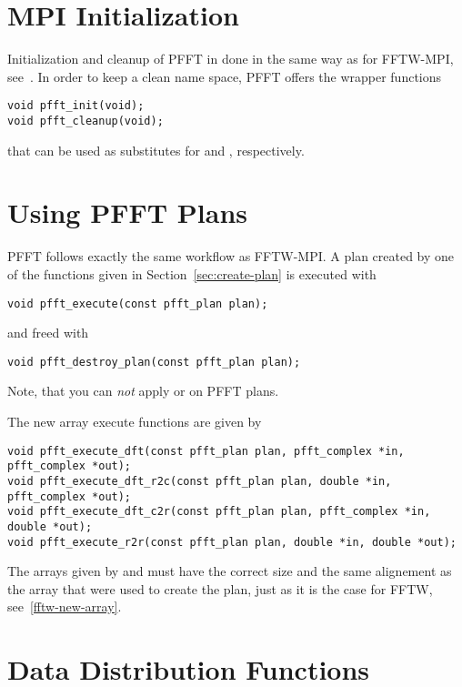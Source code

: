 \section{MPI Initialization}
Initialization and cleanup of PFFT in done in the same way as for FFTW-MPI, see~\cite{fftw-mpi-init}.
In order to keep a clean name space, PFFT offers the wrapper functions 
\begin{lstlisting}
void pfft_init(void);
void pfft_cleanup(void);
\end{lstlisting}
that can be used as substitutes for  and , respectively.

\section{Using PFFT Plans}
PFFT follows exactly the same workflow as FFTW-MPI. 
A plan created by one of the functions given in Section~\ref{sec:create-plan} is executed with
\begin{lstlisting}
void pfft_execute(const pfft_plan plan);
\end{lstlisting}
and freed with
\begin{lstlisting}
void pfft_destroy_plan(const pfft_plan plan);
\end{lstlisting}
Note, that you can \emph{not} apply  or  on PFFT plans. 

The new array execute functions are given by
\begin{lstlisting}
void pfft_execute_dft(const pfft_plan plan, pfft_complex *in, pfft_complex *out);
void pfft_execute_dft_r2c(const pfft_plan plan, double *in, pfft_complex *out);
void pfft_execute_dft_c2r(const pfft_plan plan, pfft_complex *in, double *out);
void pfft_execute_r2r(const pfft_plan plan, double *in, double *out);
\end{lstlisting}
The arrays given by  and  must have the correct size
and the same alignement as the array that were used to create the plan, just as it is the case for FFTW, see~\ref{fftw-new-array}.



\section{Data Distribution Functions}\label{sec:local-size}

